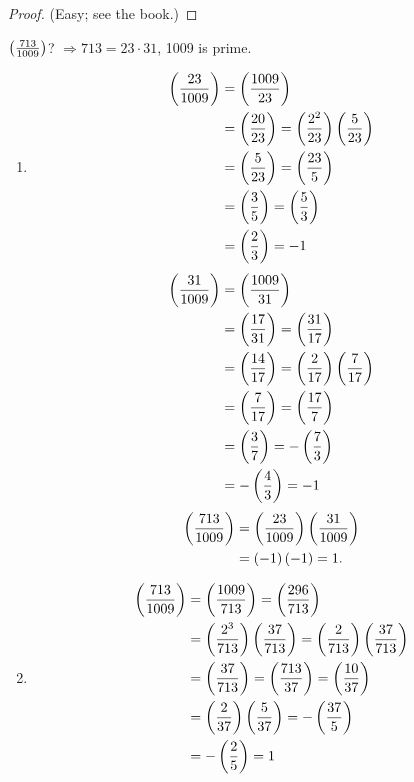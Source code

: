 \begin{proof}
    (Easy; see the book.)
\end{proof}

\begin{example}
    $\left(\frac{713}{1009}\right)$? $\Rightarrow 713 = 23 \cdot 31$, 1009 is prime.

    \begin{enumerate}
        \item \begin{align*}
            \left(\frac{23}{1009}\right) &= \left(\frac{1009}{23}\right)\\
            &= \left(\frac{20}{23}\right) = \left(\frac{2^2}{23}\right)\left(\frac{5}{23}\right) \\
            &= \left(\frac{5}{23}\right) = \left(\frac{23}{5}\right) \\
            &= \left(\frac{3}{5}\right) = \left(\frac{5}{3}\right) \\
            &= \left(\frac{2}{3}\right) = -1
        \end{align*}
        \begin{align*}
            \left(\frac{31}{1009}\right) &= \left(\frac{1009}{31}\right) \\
            &= \left(\frac{17}{31}\right) = \left(\frac{31}{17}\right) \\
            &= \left(\frac{14}{17}\right) = \left(\frac{2}{17}\right)\left(\frac{7}{17}\right) \\
            &= \left(\frac{7}{17}\right) = \left(\frac{17}{7}\right) \\
            &= \left(\frac{3}{7}\right) = -\left(\frac{7}{3}\right)\\
            &= -\left(\frac{4}{3}\right) = -1
        \end{align*}
        \begin{align*}
            \left(\frac{713}{1009}\right) &= \left(\frac{23}{1009}\right)\left(\frac{31}{1009}\right) \\
            &= \left(-1\right)\left(-1\right) = 1.
        \end{align*}
        \item \begin{align*}
            \left(\frac{713}{1009}\right) &= \left(\frac{1009}{713}\right) = \left(\frac{296}{713}\right) \\
            &= \left(\frac{2^3}{713}\right)\left(\frac{37}{713}\right) = \left(\frac{2}{713}\right)\left(\frac{37}{713}\right) \\
            &= \left(\frac{37}{713}\right) = \left(\frac{713}{37}\right) = \left(\frac{10}{37}\right) \\
            &= \left(\frac{2}{37}\right)\left(\frac{5}{37}\right) = -\left(\frac{37}{5}\right) \\
            &= -\left(\frac{2}{5}\right) = 1
        \end{align*}
    \end{enumerate}
\end{example}